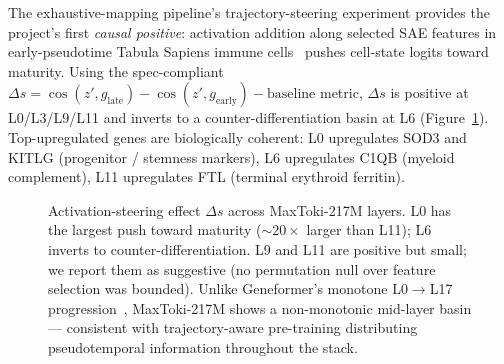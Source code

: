 \documentclass{article}
\newcommand{\maxtoki}{MaxToki-217M\xspace}
\begin{document}
The exhaustive-mapping pipeline's trajectory-steering experiment
provides the project's first \emph{causal positive}: activation
addition along selected SAE features in early-pseudotime Tabula
Sapiens immune cells~\citep{tabulasapiens2022} pushes cell-state
logits toward maturity. Using the spec-compliant
$\Delta s = \cos(z', g_{\text{late}}) - \cos(z', g_{\text{early}})
- \text{baseline}$ metric, $\Delta s$ is positive at L0/L3/L9/L11
and inverts to a counter-differentiation basin at L6
(Figure~\ref{fig:steering}). Top-upregulated genes are
biologically coherent: L0 upregulates SOD3 and KITLG (progenitor /
stemness markers), L6 upregulates C1QB (myeloid complement), L11
upregulates FTL (terminal erythroid ferritin).

\begin{figure}[t]
\centering
{}
\caption{Activation-steering effect $\Delta s$ across \maxtoki{}
layers. L0 has the largest push toward maturity ($\sim$$20\times$
larger than L11); L6 inverts to counter-differentiation. L9 and
L11 are positive but small; we report them as suggestive (no
permutation null over feature selection was bounded). Unlike
Geneformer's monotone L0$\to$L17
progression~\citep{anon2026exhaustive}, \maxtoki{} shows a
non-monotonic mid-layer basin --- consistent with trajectory-aware
pre-training distributing pseudotemporal information throughout
the stack.}
\label{fig:steering}
\end{figure}
\end{document}
